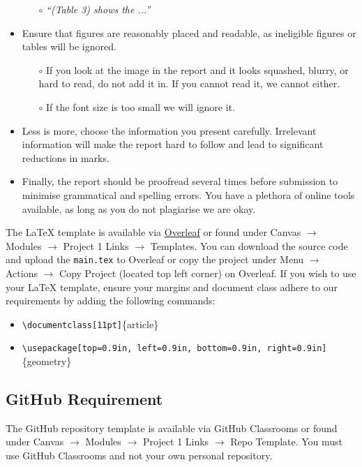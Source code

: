 \documentclass[12pt]{article}
\begin{document}
\begin{itemize}
\begin{itemize}
        \item[$\circ$] \textit{``(Table 3) shows the ...''}
    \end{itemize}
    \item Ensure that figures are reasonably placed and readable, as ineligible figures or tables will be ignored.
    \begin{itemize}
        \item[$\circ$] If you look at the image in the report and it looks squashed, blurry, or hard to read, do not add it in. If you cannot read it, we cannot either.
        \item[$\circ$] If the font size is too small we will ignore it.
    \end{itemize}
    \item Less is more, choose the information you present carefully. Irrelevant information will make the report hard to follow and lead to significant reductions in marks.
    \item Finally, the report should be proofread several times before submission to minimise grammatical and spelling errors. You have a plethora of online tools available, as long as you do not plagiarise we are okay.
\end{itemize}

The LaTeX template is available via \href{https://www.overleaf.com/read/yhfwddhzxyzw}{Overleaf} or found under Canvas $\rightarrow$ Modules $\rightarrow$ Project 1 Links $\rightarrow$ Templates. You can download the source code and upload the \texttt{main.tex} to Overleaf or copy the project under Menu $\rightarrow$ Actions $\rightarrow$ Copy Project (located top left corner) on Overleaf. If you wish to use your LaTeX template, ensure your margins and document class adhere to our requirements by adding the following commands:
\begin{itemize}
    \item \lstinline[language={[LaTeX]TeX},basicstyle=\ttfamily]{\documentclass[11pt]}\{article\}
    \item \lstinline[language={[LaTeX]TeX},basicstyle=\ttfamily]{\usepackage[top=0.9in, left=0.9in, bottom=0.9in, right=0.9in]}\{geometry\}
\end{itemize}

\subsection*{GitHub Requirement}
The GitHub repository template is available via GitHub Classrooms or found under Canvas $\rightarrow$ Modules $\rightarrow$ Project 1 Links $\rightarrow$ Repo Template. You must use GitHub Classrooms and not your own personal repository. \\
\end{document}
